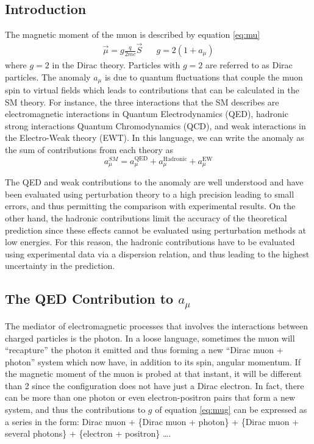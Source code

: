 \documentclass{outhesis}
\begin{document}
\subsection{Introduction}
The magnetic moment of the muon is described by equation \ref{eq:mu}
\begin{equation}
\begin{split}
\overrightarrow{\mu} = g\frac{q}{2mc}\overrightarrow{S} \,\,\,\,\,\,\,\,\,\,  g = 2\left(1+a_{\mu}\right)
\label{mug}
\end{split}
\end{equation}
where $g=2$ in the Dirac theory. Particles with $g=2$ are referred to as Dirac particles. The anomaly $a_{\mu}$ is due to quantum fluctuations that couple the muon spin to virtual fields which leads to contributions that can be calculated in the SM theory. For instance, the three interactions that the SM describes are electromagnetic interactions in Quantum Electrodynamics (QED), hadronic strong interactions Quantum Chromodynamics (QCD), and weak interactions in the Electro-Weak theory (EWT). In this language, we can write the anomaly as the sum of contributions from each theory as
\begin{equation}
a_{\mu}^{SM} = a_{\mu}^{\text{QED}}+a_{\mu}^{\text{Hadronic}}+a_{\mu}^{\text{EW}}
\label{eq:asm}
\end{equation}

The QED and weak contributions to the anomaly are well understood and have been evaluated using perturbation theory to a high precision leading to small errors, and thus permitting the comparison with experimental results. On the other hand, the hadronic contributions limit the accuracy of the theoretical prediction since these effects cannot be evaluated using perturbation methods at low energies. For this reason, the hadronic contributions have to be evaluated using experimental data via a dispersion relation, and thus leading to the highest uncertainty in the prediction.

\subsection{The QED Contribution to $a_{\mu}$}

The mediator of electromagnetic processes that involves the interactions between charged particles is the photon. In a loose language, sometimes the muon will ``recapture'' the photon it emitted and thus forming a new ``Dirac muon + photon'' system which now have, in addition to its spin, angular momentum. %
If the magnetic moment of the muon is probed at that instant, it will be different than 2 since the configuration does not have just a Dirac electron. In fact, there can be more than one photon or even electron-positron pairs that form a new system, and thus the contributions to $g$ of equation \ref{eq:mug} can be expressed as a series in the form: Dirac muon + \{Dirac muon + photon\} + \{Dirac muon + several photons\} + \{electron + positron\} \ldots.
\end{document}
